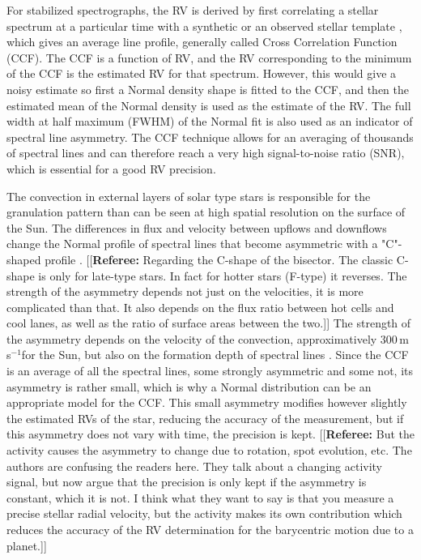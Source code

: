 \documentclass[11pt, oneside]{article}
\def\ms{\hbox{\,m\,s$^{-1}$}}         %
\newcommand{\comment}[1]{{\color{red}[[\textbf{Referee: }#1]]}}
\begin{document}
{For stabilized spectrographs, the RV is derived by first correlating a stellar spectrum at a particular time with a synthetic \citep[][]{Baranne-1996,Pepe-2002a} or an observed stellar template \citep[][]{Anglada-Escude-2012}, which gives an average line profile, generally called Cross Correlation Function (CCF).  The CCF is a function of RV, and the RV corresponding to the minimum of the CCF is the estimated RV for that spectrum.  However, this would give a noisy estimate so first a Normal density shape is fitted to the CCF, and then the estimated mean of the Normal density is used as the estimate of the RV.  The full width at half maximum (FWHM) of the Normal fit is also used as an indicator of spectral line asymmetry.
The CCF technique allows for an averaging of thousands of spectral lines and can therefore reach a very high signal-to-noise ratio (SNR), which is essential for a good RV precision.

The convection in external layers of solar type stars is responsible for the granulation pattern than can be seen at high spatial resolution on the surface of the Sun. The differences in flux and velocity between upflows and downflows change the Normal profile of spectral lines that become asymmetric with a "C"-shaped profile \citep[][]{Dravins-1981}. 
\comment{Regarding the C-shape of the bisector. The classic C-shape is only for late-type stars. In fact for hotter stars (F-type) it reverses.
The strength of the asymmetry depends not just on the velocities, it is more complicated than that. It also depends on the flux ratio between hot cells and cool lanes, as well as the ratio of surface areas between the two.}
The strength of the asymmetry depends on the velocity of the convection, approximatively 300\ms for the Sun, but also on the formation depth of spectral lines \citep{Gray-2009}. Since the CCF is an average of all the spectral lines, some strongly asymmetric and some not, its asymmetry is rather small, which is why a Normal distribution can be an appropriate model for the CCF. This small asymmetry modifies however slightly the estimated RVs of the star, reducing the accuracy of the measurement, but if this asymmetry does not vary with time, the precision is kept.
\comment{But the activity causes the asymmetry to change due to rotation, spot evolution, etc. The authors are confusing the readers here. They talk about a changing activity signal, but now argue that the precision is only kept if the asymmetry is constant, which it is not. I think what they want to say is that you measure a precise stellar radial velocity, but the activity makes its own contribution which reduces the accuracy of the RV determination for the barycentric motion due to a planet.}


}
\end{document}

